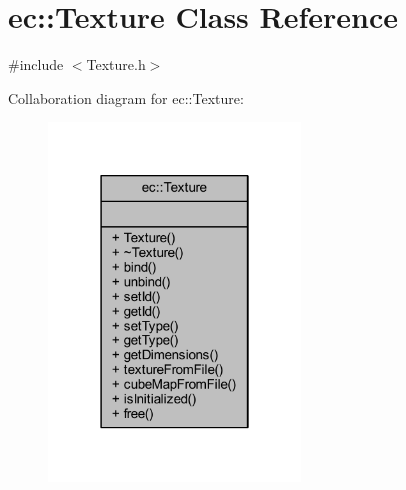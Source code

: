 \hypertarget{classec_1_1_texture}{}\section{ec\+:\+:Texture Class Reference}
\label{classec_1_1_texture}


{\ttfamily \#include $<$Texture.\+h$>$}



Collaboration diagram for ec\+:\+:Texture\+:\nopagebreak
\begin{figure}[H]
\begin{center}
\leavevmode
\includegraphics[width=190pt]{classec_1_1_texture__coll__graph}
\end{center}
\end{figure}
